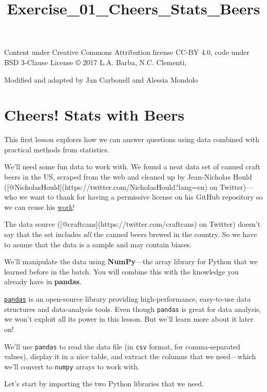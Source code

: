\documentclass[11pt]{article}
\title{Exercise\_01\_Cheers\_Stats\_Beers}
\begin{document}
    
    
    \maketitle
    
    

    
    Content under Creative Commons Attribution license CC-BY 4.0, code under
BSD 3-Clause License © 2017 L.A. Barba, N.C. Clementi,

Modified and adapted by Jan Carbonell and Alessia Mondolo

    \section{Cheers! Stats with Beers}\label{cheers-stats-with-beers}

This first lesson explores how we can answer questions using data
combined with practical methods from statistics.

We'll need some fun data to work with. We found a neat data set of
canned craft beers in the US, scraped from the web and cleaned up by
Jean-Nicholas Hould
({[}@NicholasHould{]}(https://twitter.com/NicholasHould?lang=en) on
Twitter)---who we want to thank for having a permissive license on his
GitHub repository so we can reuse his
\href{https://github.com/nickhould/craft-beers-dataset}{work}!

The data source ({[}@craftcans{]}(https://twitter.com/craftcans) on
Twitter) doesn't say that the set includes \emph{all} the canned beers
brewed in the country. So we have to asume that the data is a sample and
may contain biases.

We'll manipulate the data using \textbf{NumPy}---the array library for
Python that we learned before in the batch. You will combine this with
the knowledge you already have in \textbf{pandas}.

\href{http://pandas.pydata.org/}{\texttt{pandas}} is an open-source
library providing high-performance, easy-to-use data structures and
data-analysis tools. Even though \texttt{pandas} is great for data
analysis, we won't exploit all its power in this lesson. But we'll learn
more about it later on!

We'll use \texttt{pandas} to read the data file (in \texttt{csv} format,
for comma-separated values), display it in a nice table, and extract the
columns that we need---which we'll convert to \texttt{numpy} arrays to
work with.

Let's start by importing the two Python libraries that we need.
\end{document}
